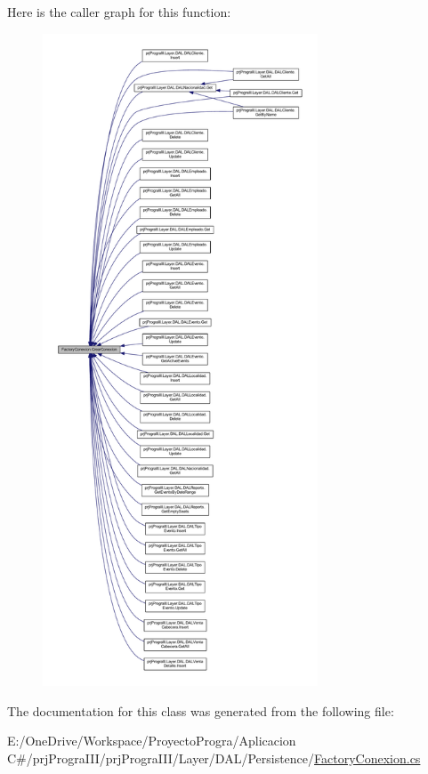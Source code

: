 Here is the caller graph for this function\+:
\nopagebreak
\begin{figure}[H]
\begin{center}
\leavevmode
\includegraphics[height=550pt]{class_factory_conexion_a60b8273ea64496e9eaa9aab3c033fb76_icgraph}
\end{center}
\end{figure}


The documentation for this class was generated from the following file\+:\begin{DoxyCompactItemize}
\item 
E\+:/\+One\+Drive/\+Workspace/\+Proyecto\+Progra/\+Aplicacion C\#/prj\+Progra\+I\+I\+I/prj\+Progra\+I\+I\+I/\+Layer/\+D\+A\+L/\+Persistence/\hyperlink{_factory_conexion_8cs}{Factory\+Conexion.\+cs}\end{DoxyCompactItemize}

